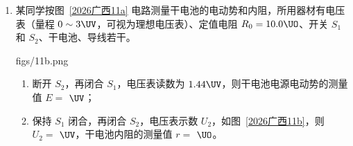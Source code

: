 \documentclass[\gkver]{gaokaozhenti}
\begin{document}
\begin{enumerate}
{B．由几何关系可知，椭圆轨道的半长轴为 $a = \frac{R_{1} + R_{2}}{2}$，由开普勒第三定律有 $\frac{a^{3}}{T^{2}} = \frac{R_{2}^{3}}{T_{2}^{2}}$，

由万有引力提供向心力有 $\frac{GMm}{R_{2}^{2}} = m\frac{4\pi^{2}}{T_{2}^{2}}R_{2}$，

联立解得 $T = 2\pi\sqrt{\frac{(R_{1} + R_{2})^{3}}{8GM}}$，故 B 错误；

C．变轨卫星从 $P$ 到 $K$ 经过半个椭圆，则运动时间 $t = \frac{1}{2}T = \pi\sqrt{\frac{(R_{1} + R_{2})^{3}}{8GM}}$，

卫星在高轨道 2 的角速度为 $\omega_{2} = \frac{v_{2}}{R_{2}} = \sqrt{\frac{GM}{R_{2}^{3}}}$，

则高轨卫星从 $Q$ 到 $K$ 转过的角度 $\angle QOK = \omega_{2}t = \frac{\pi}{4}\sqrt{\frac{2(R_{1} + R_{2})^{3}}{R_{2}^{3}}}$，

则有 $\angle POQ = \pi - \frac{\pi}{4}\sqrt{\frac{2(R_{1} + R_{2})^{3}}{R_{2}^{3}}}$，故 C 正确；

D．由上述分析同理可得，卫星在轨道 1 的角速度为 $\omega_{1} = \sqrt{\frac{GM}{R_{1}^{3}}}$，

由于 $R_{2} > R_{1}$，则有 $\omega_{1} > \omega_{2}$，

由几何关系可知，第一次相距最近时，相对转过的角度等于初始位置角度差，即

$\left(\omega_{1} - \omega_{2}\right)t = \angle POQ = \pi - \frac{\pi}{4}\sqrt{\frac{2\left(R_{1} + R_{2}\right)^{3}}{R_{2}^{3}}}$，

解得 $t = \frac{\sqrt{R_{1}^{3}R_{2}^{3}}\left[\pi - \frac{1}{4}\pi\sqrt{\frac{2(R_{1} + R_{2})^{3}}{R_{2}^{3}}}\right]}{\sqrt{GM}\left(\sqrt{R_{2}^{3}} - \sqrt{R_{1}^{3}}\right)}$，故 D 错误。

故选 AC。
}
\item
某同学按图~\ref{2026广西11a} 电路测量干电池的电动势和内阻，所用器材有电压表（量程 $0 \sim 3 \UV$，可视为理想电压表）、定值电阻 $R_{0} = 10.0 \UO$、开关 $S_{1}$ 和 $S_{2}$、干电池、导线若干。

{figs/11b.png}

\begin{enumerate}
	\item
	断开 $S_{2}$，再闭合 $S_{1}$，电压表读数为 $1.44 \UV$，则干电池电源电动势的测量值 $E =$  $\UV$；
	\item
	保持 $S_{1}$ 闭合，再闭合 $S_{2}$，电压表示数 $U_{2}$，如图~\ref{2026广西11b}，则 $U_{2} =$  $\UV$，干电池内阻的测量值 $r =$  $\UO$。
\end{enumerate}


\end{enumerate}
\end{document}
